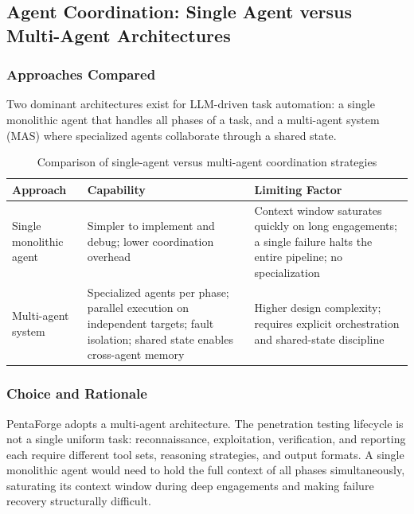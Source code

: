 \documentclass[12pt,a4paper]{report}
\begin{document}
\subsection{Agent Coordination: Single Agent versus Multi-Agent Architectures}

\subsubsection{Approaches Compared}

Two dominant architectures exist for LLM-driven task automation: a single
monolithic agent that handles all phases of a task, and a multi-agent
system (MAS) where specialized agents collaborate through a shared state.

\begin{table}[H]
    \centering
    \renewcommand{\arraystretch}{1.35}
    \begin{tabular}{|p{}|p{}|p{}|}
        \hline
        \textbf{Approach} & \textbf{Capability} & \textbf{Limiting Factor} \\
        \hline
        Single monolithic agent & Simpler to implement and debug; lower
        coordination overhead & Context window saturates quickly on long
        engagements; a single failure halts the entire pipeline; no
        specialization \\
        \hline
        Multi-agent system & Specialized agents per phase; parallel execution
        on independent targets; fault isolation; shared state enables
        cross-agent memory & Higher design complexity; requires explicit
        orchestration and shared-state discipline \\
        \hline
    \end{tabular}
    \caption{Comparison of single-agent versus multi-agent coordination strategies}
    \label{tab:mas_approaches}
\end{table}

\subsubsection{Choice and Rationale}

PentaForge adopts a multi-agent architecture. The penetration testing
lifecycle is not a single uniform task: reconnaissance, exploitation,
verification, and reporting each require different tool sets, reasoning
strategies, and output formats. A single monolithic agent would need to
hold the full context of all phases simultaneously, saturating its context
window during deep engagements and making failure recovery structurally
difficult.
\end{document}
